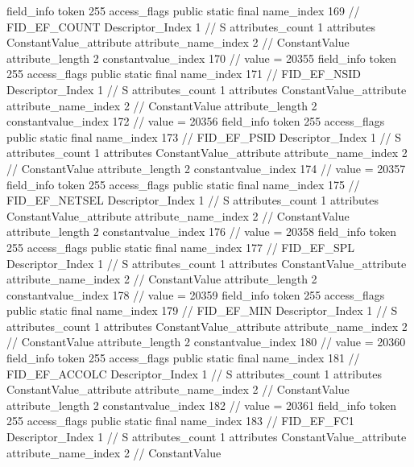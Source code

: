 {{{{{{{				}
				}
			}
			field_info {
				token	255
				access_flags	public static final
				name_index	169		// FID_EF_COUNT
				Descriptor_Index	1		// S
				attributes_count	1
				attributes {
				ConstantValue_attribute {
					attribute_name_index	2		// ConstantValue
					attribute_length	2
					constantvalue_index	170		// value = 20355
				}
				}
			}
			field_info {
				token	255
				access_flags	public static final
				name_index	171		// FID_EF_NSID
				Descriptor_Index	1		// S
				attributes_count	1
				attributes {
				ConstantValue_attribute {
					attribute_name_index	2		// ConstantValue
					attribute_length	2
					constantvalue_index	172		// value = 20356
				}
				}
			}
			field_info {
				token	255
				access_flags	public static final
				name_index	173		// FID_EF_PSID
				Descriptor_Index	1		// S
				attributes_count	1
				attributes {
				ConstantValue_attribute {
					attribute_name_index	2		// ConstantValue
					attribute_length	2
					constantvalue_index	174		// value = 20357
				}
				}
			}
			field_info {
				token	255
				access_flags	public static final
				name_index	175		// FID_EF_NETSEL
				Descriptor_Index	1		// S
				attributes_count	1
				attributes {
				ConstantValue_attribute {
					attribute_name_index	2		// ConstantValue
					attribute_length	2
					constantvalue_index	176		// value = 20358
				}
				}
			}
			field_info {
				token	255
				access_flags	public static final
				name_index	177		// FID_EF_SPL
				Descriptor_Index	1		// S
				attributes_count	1
				attributes {
				ConstantValue_attribute {
					attribute_name_index	2		// ConstantValue
					attribute_length	2
					constantvalue_index	178		// value = 20359
				}
				}
			}
			field_info {
				token	255
				access_flags	public static final
				name_index	179		// FID_EF_MIN
				Descriptor_Index	1		// S
				attributes_count	1
				attributes {
				ConstantValue_attribute {
					attribute_name_index	2		// ConstantValue
					attribute_length	2
					constantvalue_index	180		// value = 20360
				}
				}
			}
			field_info {
				token	255
				access_flags	public static final
				name_index	181		// FID_EF_ACCOLC
				Descriptor_Index	1		// S
				attributes_count	1
				attributes {
				ConstantValue_attribute {
					attribute_name_index	2		// ConstantValue
					attribute_length	2
					constantvalue_index	182		// value = 20361
				}
				}
			}
			field_info {
				token	255
				access_flags	public static final
				name_index	183		// FID_EF_FC1
				Descriptor_Index	1		// S
				attributes_count	1
				attributes {
				ConstantValue_attribute {
					attribute_name_index	2		// ConstantValue
}}}}}}}
